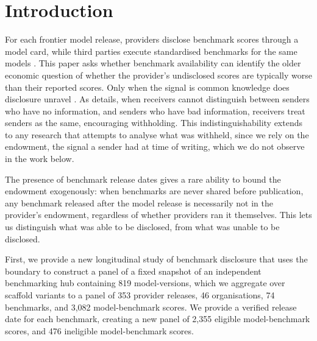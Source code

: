 \section{Introduction}\label{sec:intro}

For each frontier model release, providers disclose benchmark scores through a model card, while third parties execute standardised benchmarks for the same models \citep{liang2022helm,epoch2026hub}. This paper asks whether benchmark availability can identify the older economic question of whether the provider's undisclosed scores are typically worse than their reported scores. Only when the signal is common knowledge does disclosure unravel \citep{grossman1981,milgrom1981}. As \citet{dye1985} details, when receivers cannot distinguish between senders who have no information, and senders who have bad information, receivers treat senders as the same, encouraging withholding. This indistinguishability extends to any research that attempts to analyse what was withheld, since we rely on the endowment, the signal a sender had at time of writing, which we do not observe in the work below.

The presence of benchmark release dates gives a rare ability to bound the endowment exogenously: when benchmarks are never shared before publication, any benchmark released after the model release is necessarily not in the provider's endowment, regardless of whether providers ran it themselves. This lets us distinguish what was able to be disclosed, from what was unable to be disclosed.

First, we provide a new longitudinal study of benchmark disclosure that uses the boundary to construct a panel of a fixed snapshot of an independent benchmarking hub containing 819 model-versions, which we aggregate over scaffold variants to a panel of 353 provider releases, 46 organisations, 74 benchmarks, and 3,082 model-benchmark scores. We provide a verified release date for each benchmark, creating a new panel of 2,355 eligible model-benchmark scores, and 476 ineligible model-benchmark scores.

